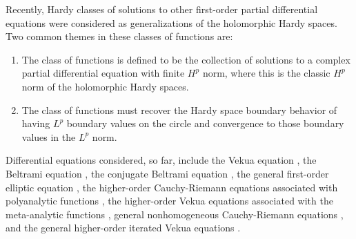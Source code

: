 \documentclass[12pt,reqno]{amsart}
\theoremstyle{definition}
\theoremstyle{remark}
\begin{document}
    Recently, Hardy classes of solutions to other first-order partial differential equations were considered as generalizations of the holomorphic Hardy spaces. Two common themes in these classes of functions are:
        \begin{enumerate}
            \item The class of functions is defined to be the collection of solutions to a complex partial differential equation with finite $H^p$ norm, where this is the classic $H^p$ norm of the holomorphic Hardy spaces. 
            \item The class of functions must recover the Hardy space boundary behavior of having $L^p$ boundary values on the circle and convergence to those boundary values in the $L^p$ norm. 
        \end{enumerate}
    Differential equations considered, so far, include the Vekua equation \cite{KlimBook, threedvek, BoundExtVek, PozHardy}, the Beltrami equation \cite{Zins, quasiHardy, quasiHardy2, quasiHardy3, quasiHardy4, quasiHardy5, Klim2014, KlimBook, Klim2016Pathlogical}, the conjugate Beltrami equation \cite{conjbel, BoundedExtremal, CompOp, moreVekHardy}, the general first-order elliptic equation \cite{Klim2016}, the higher-order Cauchy-Riemann equations associated with polyanalytic functions \cite{polyhardy}, the higher-order Vekua equations associated with the meta-analytic functions \cite{metahardy, WB3}, general nonhomogeneous Cauchy-Riemann equations \cite{WB}, and the general higher-order iterated Vekua equations \cite{WBD}.
\end{document}
